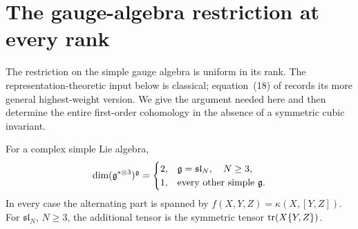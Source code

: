 \section{The gauge-algebra restriction at every rank}
\label{sec:lie-classification}

The restriction on the simple gauge algebra is uniform in its rank.  The
representation-theoretic input below is classical; equation~(18) of
\cite{UrichukWalton} records its more general highest-weight version.  We
give the argument needed here and then determine the entire first-order
cohomology in the absence of a symmetric cubic invariant.

\begin{proposition}
\label{prop:uniform-cubic}
For a complex simple Lie algebra,
\begin{equation}
\dim(\mathfrak g^{*\otimes3})^{\mathfrak g}=
\begin{cases}
2,&\mathfrak g=\mathfrak{sl}_N,\quad N\ge3,\\
1,&\text{every other simple }\mathfrak g.
\end{cases}
\label{eq:uniform-cubic}
\end{equation}
In every case the alternating part is spanned by
$f(X,Y,Z)=\kappa(X,[Y,Z])$.  For $\mathfrak{sl}_N$, $N\ge3$, the additional
tensor is the symmetric tensor $\operatorname{tr}(X\{Y,Z\})$.
\end{proposition}

